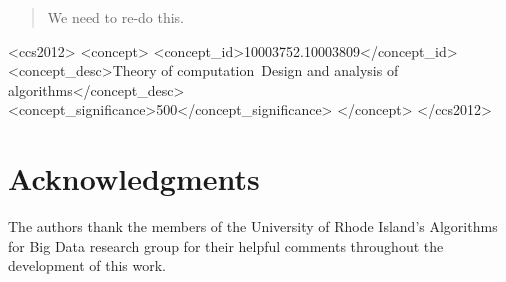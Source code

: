 \documentclass[acmlarge]{acmart}
\begin{document}
\begin{abstract}

  We need to re-do this. 
\end{abstract}

\begin{CCSXML}
<ccs2012>
   <concept>
       <concept_id>10003752.10003809</concept_id>
       <concept_desc>Theory of computation~Design and analysis of algorithms</concept_desc>
       <concept_significance>500</concept_significance>
       </concept>
 </ccs2012>
\end{CCSXML}


\maketitle

    
    
    
    
    

    \section*{Acknowledgments}
    The authors thank the members of the University of Rhode Island's Algorithms for Big Data research group for their helpful comments throughout the development of this work.

    \FloatBarrier
    
    
\end{document}
